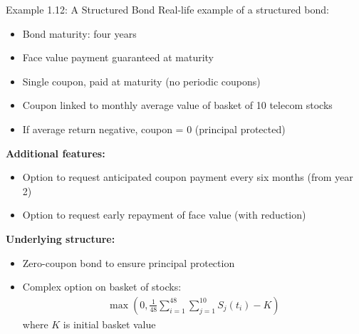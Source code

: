\documentclass[10pt,handout]{beamer}
\begin{document}
\begin{frame}{Example 1.12: A Structured Bond}
  Real-life example of a structured bond:
  \begin{itemize}
    \item Bond maturity: four years
    \item Face value payment guaranteed at maturity
    \item Single coupon, paid at maturity (no periodic coupons)
    \item Coupon linked to monthly average value of basket of 10 telecom stocks
    \item If average return negative, coupon = 0 (principal protected)
  \end{itemize}
  
  \pause
  \textbf{Additional features:}
  \begin{itemize}
    \item Option to request anticipated coupon payment every six months (from year 2)
    \item Option to request early repayment of face value (with reduction)
  \end{itemize}
  
  \pause
  \textbf{Underlying structure:}
  \begin{itemize}
    \item Zero-coupon bond to ensure principal protection
    \item Complex option on basket of stocks:
    \begin{align*}
      \max\left(0, \tfrac{1}{48}\sum_{i=1}^{48}\sum_{j=1}^{10}S_j(t_i) - K\right)
    \end{align*}
    where $K$ is initial basket value
  \end{itemize}
\end{frame}
\end{document}
